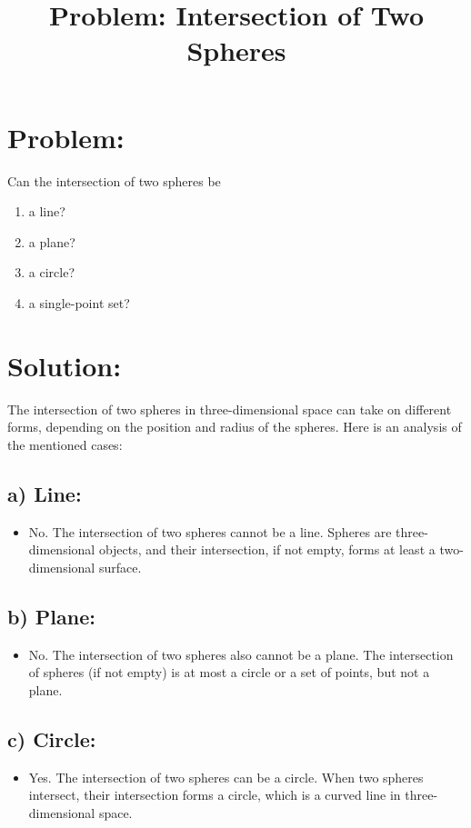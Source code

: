 \documentclass[a4paper,12pt]{article}
\title{Problem: Intersection of Two Spheres}
\author{}
\date{}
\begin{document}
\maketitle

\section*{Problem:} 
Can the intersection of two spheres be
\begin{enumerate}
    \item a line?
    \item a plane?
    \item a circle?
    \item a single-point set?
\end{enumerate}

\section*{Solution:}

The intersection of two spheres in three-dimensional space can take on different forms, depending on the position and radius of the spheres. Here is an analysis of the mentioned cases:

\subsection*{a) Line:}
\begin{itemize}
    \item No. The intersection of two spheres cannot be a line. Spheres are three-dimensional objects, and their intersection, if not empty, forms at least a two-dimensional surface.
\end{itemize}

\subsection*{b) Plane:}
\begin{itemize}
    \item No. The intersection of two spheres also cannot be a plane. The intersection of spheres (if not empty) is at most a circle or a set of points, but not a plane.
\end{itemize}

\subsection*{c) Circle:}
\begin{itemize}
    \item Yes. The intersection of two spheres can be a circle. When two spheres intersect, their intersection forms a circle, which is a curved line in three-dimensional space.
\end{itemize}
\end{document}
